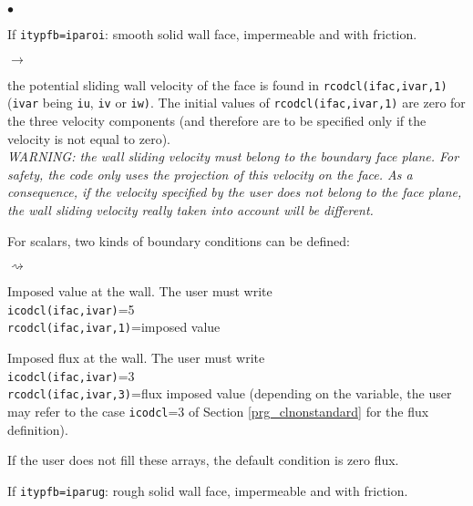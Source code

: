 {{{\begin{list}{$\bullet$}{}
\item If \texttt{itypfb=iparoi}: smooth solid wall face, impermeable and with friction.

\begin{list}{$\rightarrow$}{}
\item the potential sliding wall velocity of the face is
      found in \texttt{rcodcl(ifac,ivar,1)} (\texttt{ivar} being
      \texttt{iu}, \texttt{iv} or \texttt{iw)}. The initial
      values of \texttt{rcodcl(ifac,ivar,1)} are zero for
      the three velocity components (and therefore are to be specified
      only if the velocity is not equal to zero). \\
{\em WARNING: the wall sliding velocity must belong to the boundary face
      plane. For safety, the code only uses the projection of this
      velocity on the face. As a consequence, if the velocity specified
      by the user does not belong to the face plane, the wall sliding velocity really
      taken into account will be different.}

\item For scalars, two kinds of boundary conditions can be
      defined:
\begin{list}{$\rightsquigarrow$}{}
\item Imposed value at the wall. The user must write\\
\hspace*{1cm}\texttt{icodcl(ifac,ivar)}=5\\
\hspace*{1cm}\texttt{rcodcl(ifac,ivar,1)}=imposed value\\
\item Imposed flux at the wall. The user must write\\
\hspace*{1cm}\texttt{icodcl(ifac,ivar)}=3\\
\hspace*{1cm}\texttt{rcodcl(ifac,ivar,3)}=flux imposed value (depending on the variable, the user may refer to the case \texttt{icodcl}=3 of Section \ref{prg_clnonstandard} for the flux definition).
\item If the user does not fill these arrays, the default condition
      is zero flux.
\end{list}
\end{list}

\item If \texttt{itypfb=iparug}: rough solid wall face, impermeable and with friction.


\end{list}}}}

